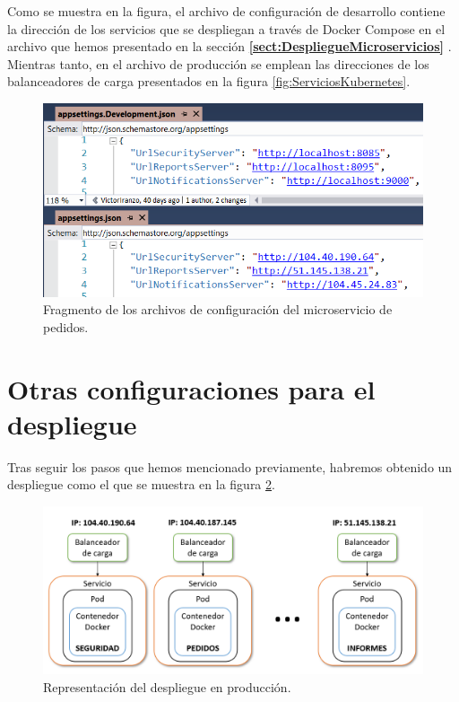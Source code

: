 \documentclass[11pt,spanish,listoffigures]{tfgetsinf}
\begin{document}
Como se muestra en la figura, el archivo de configuración de desarrollo contiene la dirección de los servicios que se despliegan a través de Docker Compose en el archivo que hemos presentado en la sección \textbf{\ref{sect:DespliegueMicroservicios} }. Mientras tanto, en el archivo de producción se emplean las direcciones de los balanceadores de carga presentados en la figura \ref{fig:ServiciosKubernetes}.

\begin{figure}[h]
\centering
\includegraphics[scale=0.7]{appsettings}
\caption{Fragmento de los archivos de configuración del microservicio de pedidos.}
\label{fig:appsettings}
\end{figure}

\newpage

\section{Otras configuraciones para el despliegue} \label{sect:DespliegueOtros}

Tras seguir los pasos que hemos mencionado previamente, habremos obtenido un despliegue como el que se muestra en la figura \ref{fig:DespliegueProduccion}.

\begin{figure}[h]
\centering
\includegraphics[scale=0.65]{DespliegueProduccion}
\caption{Representación del despliegue en producción.}
\label{fig:DespliegueProduccion}
\end{figure}
\end{document}

